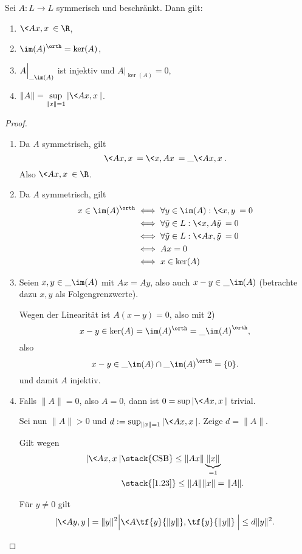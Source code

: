 \begin{st} \label{3.3}
	Sei $A: L \to L$ symmerisch und beschränkt.
	Dann gilt:
	\begin{enumerate}[1)]
		\item
			$\displaystyle \<Ax,x\> \in \R$,
		\item
			$\displaystyle \im(A)^\orth = \ker(A)$,
		\item
			$\displaystyle A \Big|_{\_{\im (A)} }$ ist injektiv und $A \Big|_{\ker(A)} = 0$,
		\item
			$\displaystyle \|A\| = \sup_{\|x\|=1} |\<Ax,x\>|$.
	\end{enumerate}
	\begin{proof}
		\begin{enumerate}[1)]
			\item
				Da $A$ symmetrisch, gilt
				\[
					\<Ax, x\> = \<x, Ax\> = \_{\<Ax,x\>}.
				\]
				Also $\<Ax, x\> \in \R$.
			\item
				Da $A$ symmetrisch, gilt
				\begin{align*}
					x \in \im(A)^\orth
					& \iff \forall y \in \im(A) : \<x,y\> = 0 \\
					& \iff \forall \tilde y \in L: \<x, A\tilde y\> = 0 \\
					& \iff \forall \tilde y \in L: \<Ax,\tilde y\> = 0 \\
					& \iff Ax = 0 \\
					& \iff x \in \ker(A)
				\end{align*}
			\item
				Seien $x,y \in \_{\im(A)}$ mit $Ax = Ay$, also auch $x-y \in \_{\im(A)}$ (betrachte dazu $x,y$ als Folgengrenzwerte).

				Wegen der Linearität ist $A(x-y) = 0$, also mit 2)
				\[
					x-y \in \ker (A) = \im(A)^\orth = \_{\im(A)}^\orth,
				\]
				also
				\[
					x-y \in \_{\im(A)} \cap \_{\im(A)}^\orth = \{0\}.
				\]
				und damit $A$ injektiv.
			\item
				Falls $\|A\| = 0$, also $A=0$, dann ist $0 = \sup |\<Ax,x\>|$ trivial.

				Sei nun $\|A\| > 0$ und $d := \sup_{\|x\|=1} |\<Ax,x\>|$.
				Zeige $d = \|A\|$.
				\begin{seg}[$d \le \|A\|$:]
					Gilt wegen
					\begin{align*}
							|\<Ax,x\>|
							&\stack{\text{CSB}} \le \|Ax\| \underbrace{\|x\|}_{=1} \\
							&\stack{\ref{1.23}}\le \|A\| \|x\|
							= \|A\|.
					\end{align*}
				\end{seg}
				\begin{seg}[$d \ge \|A\|$:]
					Für $y \neq 0$ gilt
					\[
						|\<Ay,y\>|
						= \|y\|^2 \Big| \< A \tf{y}{\|y\|}, \tf{y}{\|y\|} \> \Big|
						\le d\|y\|^2.
					\]


\end{seg}
\end{enumerate}
\end{proof}
\end{st}
